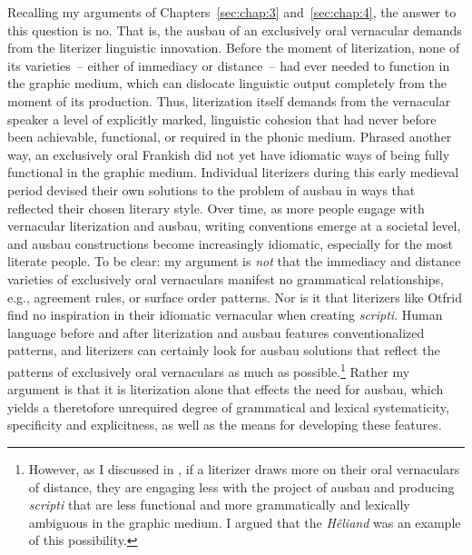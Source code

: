 Recalling my arguments of Chapters~\ref{sec:chap:3} and~\ref{sec:chap:4}, the answer to this question is no. That is, the ausbau of an exclusively oral vernacular demands from the literizer linguistic innovation. Before the moment of literization, none of its varieties~-- either of immediacy or distance~-- had ever needed to function in the graphic medium, which can dislocate linguistic output completely from the moment of its production. Thus, literization itself demands from the vernacular speaker a level of explicitly marked, linguistic cohesion that had never before been achievable, functional, or required in the phonic medium. Phrased another way, an exclusively oral Frankish did not yet have idiomatic ways of being fully functional in the graphic medium. Individual literizers during this early medieval period devised their own solutions to the problem of ausbau in ways that reflected their chosen literary style. Over time, as more people engage with vernacular literization and ausbau, writing conventions emerge at a societal level, and ausbau constructions become increasingly idiomatic, especially for the most literate people. To be clear: my argument is \textit{not} that the immediacy and distance varieties of exclusively oral vernaculars manifest no grammatical relationships, e.g., agreement rules, or surface order patterns. Nor is it that literizers like Otfrid find no inspiration in their idiomatic vernacular when creating \textit{scripti}. Human language before and after literization and ausbau features conventionalized patterns, and literizers can certainly look for ausbau solutions that reflect the patterns of exclusively oral vernaculars as much as possible.\footnote{{However, as I discussed in , if a literizer draws more on their oral vernaculars of distance, they are engaging less with the project of ausbau and producing} {\textit{scripti}} {that are less functional and more grammatically and lexically ambiguous in the graphic medium. I argued that the} {\textit{Hêliand}} {was an example of this possibility.} } Rather my argument is that it is literization alone that effects the need for ausbau, which yields a theretofore unrequired degree of grammatical and lexical systematicity, specificity and explicitness, as well as the means for developing these features.


